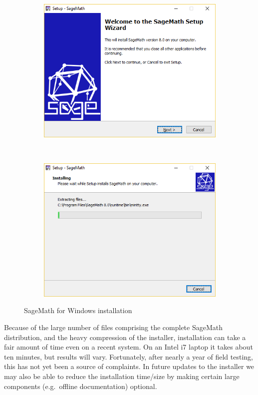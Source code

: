 \begin{figure}[h!]
    \centering
    \begin{subfigure}[b]{0.45\textwidth}
        \includegraphics[width=\textwidth]{screenshots/installer1}
    \end{subfigure}
    ~
    \begin{subfigure}[b]{0.45\textwidth}
        \includegraphics[width=\textwidth]{screenshots/installer2}
    \end{subfigure}
    \caption{SageMath for Windows installation}
    \label{fig:installation}
\end{figure}

Because of the large number of files comprising the complete SageMath
distribution, and the heavy compression of the installer, installation can take
a fair amount of time even on a recent system. On an Intel i7 laptop it takes
about ten minutes, but results will vary. Fortunately, after nearly a year of
field testing, this has not yet been a source of complaints.  In future updates
to the installer we may also be able to reduce the installation time/size by
making certain large components (e.g.~offline documentation) optional.


